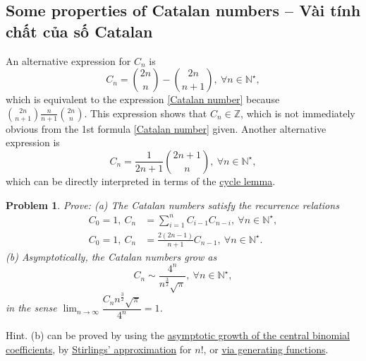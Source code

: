 \documentclass[oneside]{book}
\newtheorem{problem}{Problem}
\begin{document}

\subsection{Some properties of Catalan numbers -- Vài tính chất của số Catalan}
An alternative expression for $C_n$ is
\begin{equation*}
	C_n = \binom{2n}{n} - \binom{2n}{n + 1},\ \forall n\in\mathbb{N}^\star,
\end{equation*}
which is equivalent to the expression \eqref{Catalan number} because $\binom{2n}{n+1} \frac{n}{n+1}\binom{2n}{n}$. This expression shows that $C_n\in\mathbb{Z}$, which is not immediately obvious from the 1st formula \eqref{Catalan number} given. Another alternative expression is
\begin{equation*}
	C_n = \frac{1}{2n + 1}\binom{2n + 1}{n},\ \forall n\in\mathbb{N}^\star,
\end{equation*}
which can be directly interpreted in terms of the \href{https://en.wikipedia.org/wiki/Cycle_lemma}{cycle lemma}.

\begin{problem}
	Prove: (a) The Catalan numbers satisfy the recurrence relations
	\begin{align}
		C_0 = 1,\ C_n &= \sum_{i=1}^n C_{i-1}C_{n-i},\ \forall n\in\mathbb{N}^\star,\label{Catalan: recurrence}\\
		C_0 = 1,\ C_n &= \frac{2(2n - 1)}{n + 1}C_{n-1},\ \forall n\in\mathbb{N}^\star.\nonumber
	\end{align}
	(b) Asymptotically, the Catalan numbers grow as
	\begin{equation*}
		C_n\sim\frac{4^n}{n^{\frac{3}{2}}\sqrt{\pi}},\ \forall n\in\mathbb{N}^\star,
	\end{equation*}
	in the sense $\lim_{n\to\infty} \dfrac{C_nn^{\frac{3}{2}}\sqrt{\pi}}{4^n} = 1$.
\end{problem}
{\sf Hint.} (b) can be proved by using the \href{https://en.wikipedia.org/wiki/Central_binomial_coefficient#Asymptotic_growth}{asymptotic growth of the central binomial coefficients}, by \href{https://en.wikipedia.org/wiki/Stirling%27s_approximation}{Stirlings' approximation} for $n!$, or \href{https://en.wikipedia.org/wiki/Generating_function#Asymptotic_growth_of_the_Catalan_numbers}{via generating functions}.
\end{document}

